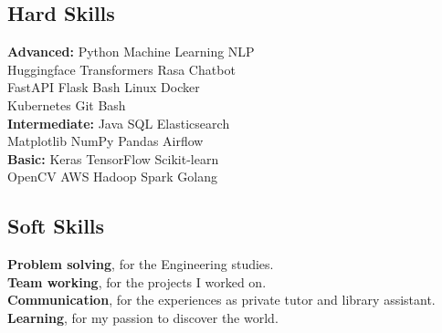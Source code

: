 \documentclass[]{deedy-resume-openfont}
\begin{document}
\begin{minipage}[t]{0.33\textwidth}
\subsection{Hard Skills}
\textbf{Advanced:} Python \textbullet{} Machine Learning \textbullet{} NLP \\
Huggingface Transformers \textbullet{} Rasa Chatbot \\
FastAPI \textbullet{} Flask \textbullet{} Bash \textbullet{} Linux \textbullet{} Docker \\
Kubernetes \textbullet{} Git \textbullet{} Bash \\
\textbf{Intermediate:} Java \textbullet{} SQL \textbullet{} Elasticsearch \\
Matplotlib \textbullet{} NumPy \textbullet{} Pandas \textbullet{} Airflow \\
\textbf{Basic:} Keras \textbullet{} TensorFlow \textbullet{} Scikit-learn \\
OpenCV \textbullet{} AWS \textbullet{} Hadoop \textbullet{} Spark \textbullet{} Golang
\sectionsep

\subsection{Soft Skills}
\textbf{Problem solving}, for the Engineering studies.\\
\textbf{Team working}, for the projects I worked on.\\
\textbf{Communication}, for the experiences as private tutor and library assistant.\\
\textbf{Learning}, for my passion to discover the world.





\end{minipage}
\end{document}
